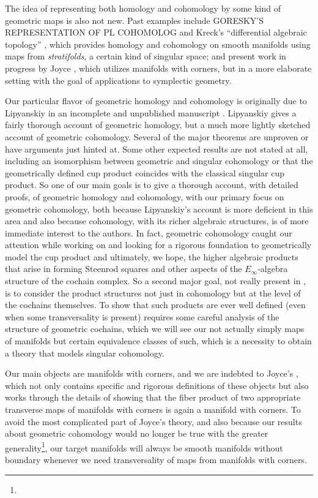 The idea of representing both homology and cohomology by some kind of geometric maps is also not new.
Past examples include GORESKY'S REPRESENTATION OF PL COHOMOLOG and Kreck's ``differential algebraic topology'' \cite{Krec10}, which provides homology and cohomology on smooth manifolds using maps from {\it stratifolds}, a certain kind of singular space; and present work in progress by Joyce \cite{Joyc15}, which utilizes manifolds with corners, but in a more elaborate setting with the goal of applications to symplectic geometry.

Our particular flavor of geometric homology and cohomology is originally due to Lipyanskiy in an incomplete and unpublished manuscript \cite{Lipy14}.
Lipyanskiy gives a fairly thorough account of geometric homology, but a much more lightly sketched account of geometric cohomology.
Several of the major theorems are unproven or have arguments just hinted at.
Some other expected results are not stated at all, including an isomorphism between geometric and singular cohomology or that the geometrically defined cup product coincides with the classical singular cup product.
So one of our main goals is to give a thorough account, with detailed proofs, of geometric homology and cohomology, with our primary focus on geometric cohomology, both because Lipyanskiy's account is more deficient in this area and also because cohomology, with its richer algebraic structures, is of more immediate interest to the authors.
In fact, geometric cohomology caught our attention while working on \cite{FMS-flows} and looking for a rigorous foundation to geometrically model the cup product and ultimately, we hope, the higher algebraic products that arise in forming Steenrod squares and other aspects of the $E_\infty$-algebra structure of the cochain complex.
So a second major goal, not really present in \cite{Lipy14}, is to consider the product structures not just in cohomology but at the level of the cochains themselves.
To show that such products are ever well defined (even when some transversality is present) requires some careful analysis of the structure of geometric cochains, which we will see our not actually simply maps of manifolds but certain equivalence classes of such, which is a necessity to obtain a theory that models singular cohomology.

Our main objects are manifolds with corners, and we are indebted to Joyce's \cite{Joy12}, which not only contains specific and rigorous definitions of these objects but also works through the details of showing that the fiber product of two appropriate transverse maps of manifolds with corners is again a manifold with corners.
To avoid the most complicated part of Joyce's theory, and also because our results about geometric cohomology would no longer be true with the greater generality\footnote{}, our target manifolds will always be smooth manifolds without boundary whenever we need transversality of maps from manifolds with corners.

